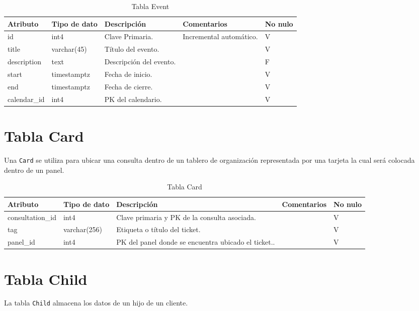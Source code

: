 \begin{table}[htbp]
\centering
\label{tab:event}

\begin{tabular}{|p{3cm}|p{2.5cm}|p{4.5cm}|p{4cm}|p{1cm}|}
\hline
\textbf{Atributo} & \textbf{Tipo de dato}  & \textbf{Descripción} & \textbf{Comentarios} & \textbf{No nulo} \\ \hline
id & int4 & Clave Primaria. & Incremental automático. & V \\ \hline
title & varchar(45) & Título del evento. &  & V \\ \hline
description & text & Descripción del evento. &  & F \\ \hline
start & timestamptz & Fecha de inicio. &  & V \\ \hline
end & timestamptz & Fecha de cierre. &  & V \\ \hline
calendar\_id & int4 & PK del calendario. &  & V \\ \hline
\end{tabular}
\caption{Tabla Event}
\end{table}


\section{Tabla Card}\label{sec:table-calendar}
Una \texttt{Card} se utiliza para ubicar una consulta dentro de un tablero de organización representada por una tarjeta la cual será colocada dentro de un panel.

\begin{table}[htbp]
\centering
\label{tab:card}

\begin{tabular}{|p{3cm}|p{2.5cm}|p{4.5cm}|p{4cm}|p{1cm}|}
\hline
\textbf{Atributo} & \textbf{Tipo de dato}  & \textbf{Descripción} & \textbf{Comentarios} & \textbf{No nulo} \\ \hline
consultation\_id & int4 & Clave primaria y PK de la consulta asociada. &  & V \\ \hline
tag & varchar(256) & Etiqueta o título del ticket. &  & V \\ \hline
panel\_id & int4 & PK del panel donde se encuentra ubicado el ticket.. &  & V \\ \hline
\end{tabular}
\caption{Tabla Card}
\end{table}



\section{Tabla Child}\label{sec:table-child}
La tabla \texttt{Child} almacena los datos de un hijo de un cliente.

